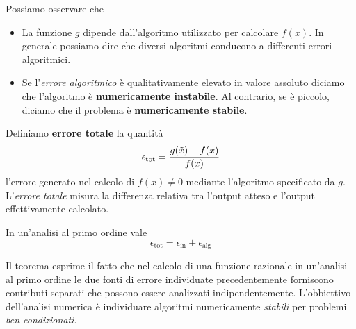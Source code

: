 \begin{observation}
	Possiamo osservare che
	\begin{itemize}
		\item La funzione $g$ dipende dall'algoritmo utilizzato per calcolare $f(x)$. In generale possiamo dire
		      che diversi algoritmi conducono a differenti errori algoritmici.
		\item Se l'\emph{errore algoritmico} è qualitativamente elevato in valore assoluto diciamo che l'algoritmo
		      è \textbf{numericamente instabile}. Al contrario, se è piccolo, diciamo che il problema è
		      \textbf{numericamente stabile}.
	\end{itemize}
\end{observation}

\begin{definition}
	Definiamo \textbf{errore totale} la quantità
	\[ \epsilon_{\text{tot}} = \frac{g(\tilde{x}) - f(x)}{f(x)} \]
	l'errore generato nel calcolo di $f(x) \neq 0$ mediante l'algoritmo specificato da $g$. L'\emph{errore totale}
	misura la differenza relativa tra l'output atteso e l'output effettivamente calcolato.
\end{definition}

\begin{theorem}
	In un'analisi al primo ordine vale
	\[ \epsilon_{\text{tot}} = \epsilon_{\text{in}} + \epsilon_{\text{alg}} \]
\end{theorem}

Il teorema esprime il fatto che nel calcolo di una funzione razionale in un'analisi al primo ordine le due fonti
di errore individuate precedentemente forniscono contributi separati che possono essere analizzati
indipendentemente. L'obbiettivo dell'analisi numerica è individuare algoritmi numericamente \emph{stabili} per
problemi \emph{ben condizionati}.